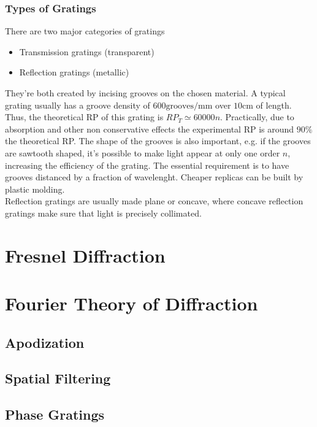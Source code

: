 \documentclass[../electromagnetism.tex]{subfiles}
\begin{document}
\subsubsection{Types of Gratings}
There are two major categories of gratings
\begin{itemize}
\item Transmission gratings (transparent)
\item Reflection gratings (metallic)
\end{itemize}
They're both created by incising grooves on the chosen material. A typical grating usually has a groove density of $600\mathrm{grooves/mm}$ over $10$cm of length. Thus, the theoretical RP of this grating is $RP_T\simeq60000 n$. Practically, due to absorption and other non conservative effects the experimental RP is around $90\%$ the theoretical RP. The shape of the grooves is also important, e.g. if the grooves are sawtooth shaped, it's possible to make light appear at only one order $n$, increasing the efficiency of the grating. The essential requirement is to have grooves distanced by a fraction of wavelenght. Cheaper replicas can be built by plastic molding.\\
Reflection gratings are usually made plane or concave, where concave reflection gratings make sure that light is precisely collimated.
\section{Fresnel Diffraction}
\section{Fourier Theory of Diffraction}
\subsection{Apodization}
\subsection{Spatial Filtering}
\subsection{Phase Gratings}
\end{document}
